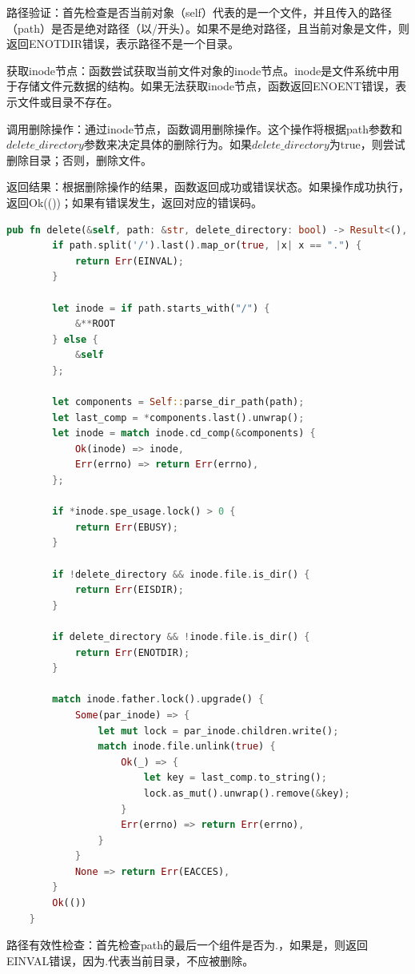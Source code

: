 路径验证：首先检查是否当前对象（self）代表的是一个文件，并且传入的路径（path）是否是绝对路径（以/开头）。如果不是绝对路径，且当前对象是文件，则返回ENOTDIR错误，表示路径不是一个目录。

获取inode节点：函数尝试获取当前文件对象的inode节点。inode是文件系统中用于存储文件元数据的结构。如果无法获取inode节点，函数返回ENOENT错误，表示文件或目录不存在。

调用删除操作：通过inode节点，函数调用删除操作。这个操作将根据path参数和$delete\_directory$参数来决定具体的删除行为。如果$delete\_directory$为true，则尝试删除目录；否则，删除文件。

返回结果：根据删除操作的结果，函数返回成功或错误状态。如果操作成功执行，返回Ok(())；如果有错误发生，返回对应的错误码。

\begin{lstlisting}[language=rust]
pub fn delete(&self, path: &str, delete_directory: bool) -> Result<(), isize> {
        if path.split('/').last().map_or(true, |x| x == ".") {
            return Err(EINVAL);
        }

        let inode = if path.starts_with("/") {
            &**ROOT
        } else {
            &self
        };

        let components = Self::parse_dir_path(path);
        let last_comp = *components.last().unwrap();
        let inode = match inode.cd_comp(&components) {
            Ok(inode) => inode,
            Err(errno) => return Err(errno),
        };

        if *inode.spe_usage.lock() > 0 {
            return Err(EBUSY);
        }

        if !delete_directory && inode.file.is_dir() {
            return Err(EISDIR);
        }

        if delete_directory && !inode.file.is_dir() {
            return Err(ENOTDIR);
        }

        match inode.father.lock().upgrade() {
            Some(par_inode) => {
                let mut lock = par_inode.children.write();
                match inode.file.unlink(true) {
                    Ok(_) => {
                        let key = last_comp.to_string();
                        lock.as_mut().unwrap().remove(&key);
                    }
                    Err(errno) => return Err(errno),
                }
            }
            None => return Err(EACCES),
        }
        Ok(())
    }
\end{lstlisting}

路径有效性检查：首先检查path的最后一个组件是否为.，如果是，则返回EINVAL错误，因为.代表当前目录，不应被删除。


